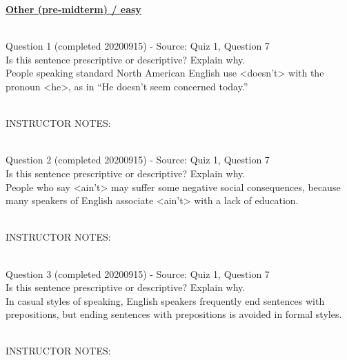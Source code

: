 \documentclass[12pt]{article}
\begin{document}
\begin{center}
\textbf{{\color{violet}{\HUGE ALL QUESTIONS\\}}}

\textbf{{\color{violet}{\HUGE BY TOPIC\\}}}

\end{center}
\newpage

\textbf{\underline{\huge Other (pre-midterm) / easy\\}}

~\\

{\large Question 1} (completed 20200915) - Source: Quiz 1, Question 7\\

Is this sentence prescriptive or descriptive? Explain why.\\

People speaking standard North American English use <doesn't> with the pronoun <he>, as in ``He doesn't seem concerned today.''


~\\
INSTRUCTOR NOTES: 


~\\

{\large Question 2} (completed 20200915) - Source: Quiz 1, Question 7\\

Is this sentence prescriptive or descriptive? Explain why.\\

People who say <ain't> may suffer some negative social consequences, because many speakers of English associate <ain't> with a lack of education.


~\\
INSTRUCTOR NOTES: 


~\\

{\large Question 3} (completed 20200915) - Source: Quiz 1, Question 7\\

Is this sentence prescriptive or descriptive? Explain why.\\

In casual styles of speaking, English speakers frequently end sentences with prepositions, but ending sentences with prepositions is avoided in formal styles.


~\\
INSTRUCTOR NOTES: 


~\\
\end{document}
